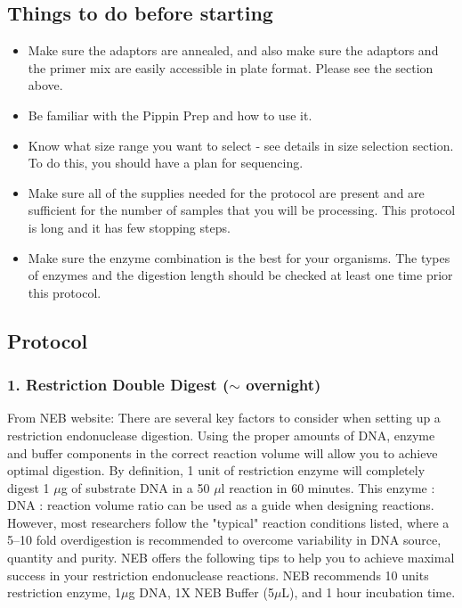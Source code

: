 \documentclass[11pt, oneside]{article}
\begin{document}
		\vspace{5mm}

	\subsection {Things to do before starting}

		\begin{itemize}[leftmargin=.5in]
			\item Make sure the adaptors are annealed, and also make sure the adaptors and the primer mix are easily accessible in plate format. Please see the section above.	
			\item Be familiar with the Pippin Prep and how to use it.
			\item Know what size range you want to select - see details in size selection section.	 To do this, you should have a plan for sequencing.		
			\item Make sure all of the supplies needed for the protocol are present and are sufficient for the number of samples that you will be processing. This protocol is long and it has few stopping steps. 
			\item Make sure the enzyme combination is the best for your organisms. The types of enzymes and the digestion length should be checked at least one time prior this protocol. 
		\end{itemize}

	
	\subsection {Protocol}

		\vspace{5mm}

\subsubsection {1. Restriction Double Digest ($\sim$ overnight)}

From NEB website: There are several key factors to consider when setting up a restriction endonuclease digestion. Using the proper amounts of DNA, enzyme and buffer components in the correct reaction volume will allow you to achieve optimal digestion. By definition, 1 unit of restriction enzyme will completely digest 1 $\mu$g of substrate DNA in a 50 $\mu$l reaction in 60 minutes. This enzyme : DNA : reaction volume ratio can be used as a guide when designing reactions. However, most researchers follow the "typical" reaction conditions listed, where a 5--10 fold overdigestion is recommended to overcome variability in DNA source, quantity and purity. NEB offers the following tips to help you to achieve maximal success in your restriction endonuclease reactions. NEB recommends 10 units restriction enzyme, 1$\mu$g DNA, 1X NEB Buffer (5$\mu$L), and 1 hour incubation time.
\end{document}
